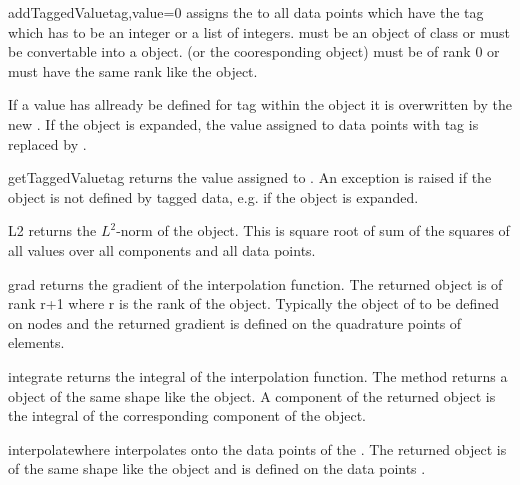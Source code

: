 \begin{methoddesc}[Data]{addTaggedValue}{tag,value=0}
assigns the  to all data points which have the tag
 which has to be an integer or a list of
integers.  must be an object of class
 or must be convertable into a
 object.  (or the cooresponding
 object) must be of rank $0$ or must have the
same rank like the object. 

If a value has allready be defined for tag  within the object
it is overwritten by the new .  If the object is expanded,
the value assigned to data points with tag  is replaced by
.
\end{methoddesc}

\begin{methoddesc}[Data]{getTaggedValue}{tag}
returns the value assigned to . An exception is raised if the
object is not defined by tagged data, e.g. if the object is
expanded.
\end{methoddesc}

\begin{methoddesc}[Data]{L2}{}
returns the $L^2$-norm of the object. This is square root of sum of
the squares of all values over all components and all data points.
\end{methoddesc}

\begin{methoddesc}[Data]{grad}{}
returns the gradient of the interpolation function. The returned
\Data object is of rank r+1 where r is the rank of the object.
Typically the object of to be defined on nodes and the returned
gradient is defined on the quadrature points of elements.
\end{methoddesc}

\begin{methoddesc}[Data]{integrate}{}
returns the integral of the interpolation function. The method returns
a  object of the same shape like the object.  A
component of the returned object is the integral of the corresponding
component of the object.  
\end{methoddesc}

\begin{methoddesc}[Data]{interpolate}{where}
interpolates onto the data points of the 
. The returned \Data object is of the same shape
like the object and is defined on the data points .
\end{methoddesc}

